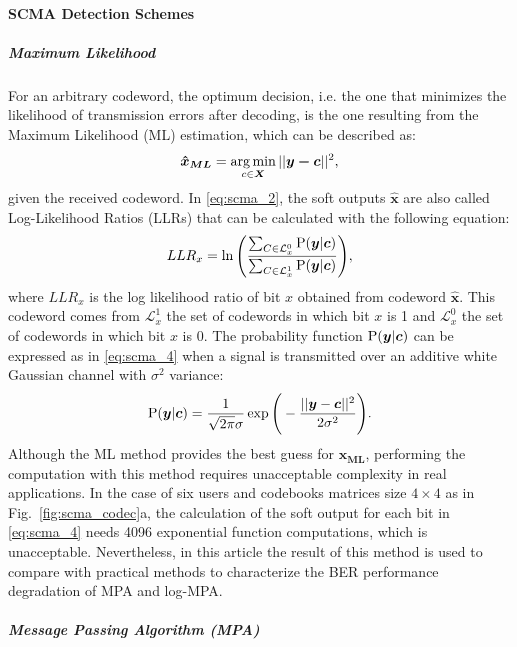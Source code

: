 \paragraph{SCMA Detection Schemes}
\label{sec:scma_detection}

\subparagraph{Maximum Likelihood}
\label{sec:scma_ml}

For an arbitrary codeword, the optimum decision, i.e. the one that minimizes the
likelihood of transmission errors after decoding, is the one resulting from the
Maximum Likelihood (ML) estimation, which can be described as:
\begin{equation}
  \label{eq:scma_2}
  \bm{\hat{x}_{ML}} = \operatorname*{arg\,min}_{c \in \bm{X}}||\bm{y - c}||^2,
\end{equation}
given the received codeword. In \eqref{eq:scma_2}, the soft outputs
$\hat{\bm{x}}$ are also called Log-Likelihood Ratios (LLRs) that can be
calculated with the following equation:
\begin{equation}
  \label{eq:scma_3}
  LLR_x = \ln\Bigg(\frac{\sum_{C\in\mathcal{L}_x^0} \operatorname{P}(\bm{y}|\bm{c})}
  {\sum_{C\in\mathcal{L}_x^1} \operatorname{P}(\bm{y}|\bm{c})}\Bigg),
\end{equation}
where $LLR_x$ is the log likelihood ratio of bit $x$ obtained from codeword
$\hat{\bm{x}}$. This codeword comes from $\mathcal{L}_x^1$ the set of codewords
in which bit $x$ is 1 and $\mathcal{L}_x^0$ the set of codewords in which bit
$x$ is 0. The probability function $\operatorname{P}(\bm{y}|\bm{c})$ can be expressed as
in \eqref{eq:scma_4} when a signal is transmitted over an additive white
Gaussian channel with $\sigma^2$ variance:
\begin{equation}
  \label{eq:scma_4}
  \operatorname{P}(\bm{y}|\bm{c}) = \frac{1}{\sqrt{2\pi}\sigma}\exp
  \Bigg(-\frac{||\bm{y}-\bm{c}||^2}{2\sigma^2}\Bigg).
\end{equation}
Although the ML method provides the best guess for $\bm{\hat{x}_{ML}}$,
performing the computation with this method requires unacceptable complexity in
real applications. In the case of six users and codebooks matrices size
$4\times4$ as in Fig.~\ref{fig:scma_codec}a, the calculation of the soft output
for each bit in \eqref{eq:scma_4} needs 4096 exponential function computations,
which is unacceptable. Nevertheless, in this article the result of this method
is used to compare with practical methods to characterize the BER performance
degradation of MPA and log-MPA.

\subparagraph{Message Passing Algorithm (MPA)}
\label{sec:scma_mpa}

